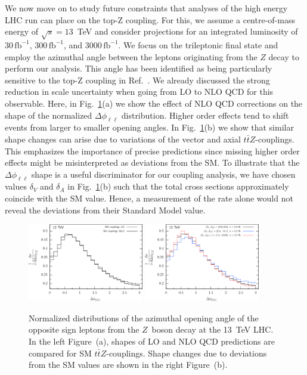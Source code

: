 \documentclass[preprint]{JHEP3}
\def\ttbZ{t\bar{t}Z}
\def\invfb {\mathrm{fb}^{-1}}
\begin{document}
We now move on to study future constraints that analyses of the high energy LHC run can place on the top-Z coupling.
For this, we assume a centre-of-mass energy of $\sqrt{s}=13$~TeV and consider projections for an integrated luminosity of
$30\, \invfb$, $300\, \invfb$, and $3000\, \invfb$. 
We focus on the trileptonic final state and employ the azimuthal angle between the leptons originating
from the $Z$ decay to perform our analysis.
This angle has been identified as being particularly sensitive to the top-Z coupling in Ref.~\cite{Baur:2004uw}.
We already discussed the strong reduction in scale uncertainty when going from LO to NLO QCD for this observable.
Here, in Fig.~\ref{fig:vi}(a) we show the effect of NLO QCD corrections on the shape of the normalized $\Delta \phi_{\ell\ell}$ distribution.
Higher order effects tend to shift events from larger to smaller opening angles.
In Fig.~\ref{fig:vi}(b) we show that similar shape changes can arise due to variations of the vector and axial $\ttbZ$-couplings.
This emphasizes the importance of precise predictions since missing higher order effects might be misinterpreted as deviations from the SM.
To illustrate that the $\Delta \phi_{\ell\ell}$ shape is a useful discriminator for our coupling analysis, we have chosen 
values $\delta_V$ and $\delta_A$ in Fig.~\ref{fig:vi}(b) such that the total cross sections approximately coincide with the SM value.
Hence, a measurement of the rate alone would not reveal the deviations from their Standard Model value.
 


\begin{figure}[t]
\centering %
\includegraphics[width=0.45\textwidth]{./LHC_53_Fig17a.eps}
\hfill
\includegraphics[width=0.45\textwidth]{./LHC_53_Fig17b.eps}
\caption{\label{fig:vi}
Normalized distributions of the azimuthal opening angle of the opposite sign leptons from the $Z$~boson decay at the 13~TeV LHC.
In the left Figure~(a), shapes of LO and NLO QCD predictions are compared for SM $\ttbZ$-couplings.
Shape changes due to deviations from the SM values are shown in the right Figure~(b).
}
\end{figure}
\end{document}
